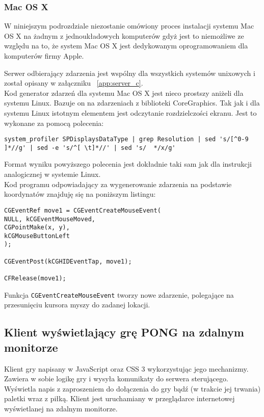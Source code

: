 \subsubsection{Mac OS X}

W niniejszym podrozdziale niezostanie omówiony proces instalacji systemu Mac OS X na żadnym z jednoukładowych komputerów gdyż jest to niemożliwe ze względu na to, że system Mac OS X jest dedykowanym oprogramowaniem dla komputerów firmy Apple. 

Serwer odbierający zdarzenia jest wspólny dla wszystkich systemów unixowych i został opisany w załączniku ~\ref{app:server_c}.
\\
Kod generator zdarzeń dla systemu Mac OS X jest nieco prostszy aniżeli dla systemu Linux. Bazuje on na zdarzeniach z biblioteki CoreGraphics. Tak jak i dla systemu Linux istotnym elementem jest odczytanie rozdzielczości ekranu. Jest to wykonane za pomocą polecenia:
\begin{lstlisting}
system_profiler SPDisplaysDataType | grep Resolution | sed 's/[^0-9 ]*//g' | sed -e 's/^[ \t]*//' | sed 's/  */x/g'
\end{lstlisting}
Format wyniku powyższego polecenia jest dokładnie taki sam jak dla instrukcji analogicznej w systemie Linux.
\\
Kod programu odpowiadający za wygenerowanie zdarzenia na podstawie koordynatów znajduję się na poniższym listingu:
\begin{lstlisting}
CGEventRef move1 = CGEventCreateMouseEvent(
NULL, kCGEventMouseMoved,
CGPointMake(x, y),
kCGMouseButtonLeft
);

CGEventPost(kCGHIDEventTap, move1);

CFRelease(move1);
\end{lstlisting}

Funkcja \lstinline{CGEventCreateMouseEvent} tworzy nowe zdarzenie, polegające na przesunięciu kursora myszy do zadanej lokacji.

\subsection{Klient wyświetlający grę PONG na zdalnym monitorze}
\label{sub:impl-displayclient-game}

Klient gry napisany w JavaScript oraz CSS 3 wykorzystując jego mechanizmy. Zawiera w sobie logikę gry i wysyła komunikaty do serwera sterującego. Wyświetla napis z zaproszeniem do dołączenia do gry bądź (w trakcie jej trwania) paletki wraz z piłką. Klient jest uruchamiany w przeglądarce internetowej wyświetlanej na zdalnym monitorze.

